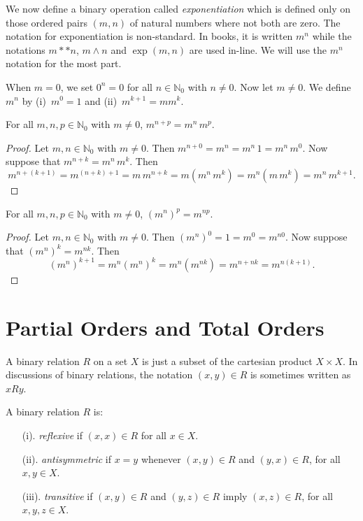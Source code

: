 We now define a binary operation called \textit{exponentiation}
which is defined only on those ordered pairs $(m,n)$ of natural
numbers where not both are zero.  The notation for exponentiation
is non-standard.  In books, it is written $m^n$ while the notations
$m**n$, $m\wedge n$ and $\exp(m,n)$ are used in-line.  We will use
the $m^n$ notation for the most part.

When $m=0$, we set $0^n=0$ for all $n\in\mathbb{N}_0$
with $n\neq0$.  Now let $m\neq0$.  We define $m^n$ by
(i)~$m^0=1$ and (ii)~$m^{k+1}=mm^k$.

\begin{theorem}
For all $m,n,p\in\mathbb{N}_0$ with $m\neq0$,
$m^{n+p}=m^n\,m^p$.
\end{theorem}

\begin{proof}
Let $m,n\in\mathbb{N}_0$ with $m\neq0$.  Then
$m^{n+0}=m^n=m^n\,1=m^n\,m^0$.
Now suppose that $m^{n+k}=m^n\,m^k$.
Then
\[
m^{n+(k+1)}=m^{(n+k)+1}=m\,m^{n+k}
 = m(m^n\,m^k)=m^n(m\,m^k)=m^n\,m^{k+1}.
\]
\end{proof}

\begin{theorem}
For all $m,n,p\in\mathbb{N}_0$ with $m\neq0$,
$(m^n)^p=m^{np}$.
\end{theorem}
\begin{proof}
Let $m,n\in\mathbb{N}_0$ with $m\neq0$.  Then
$(m^n)^0=1=m^0=m^{n0}$.  Now suppose that $(m^n)^k=m^{nk}$.
Then 
\[
(m^n)^{k+1}=m^n(m^n)^k=m^n(m^{nk})=m^{n+nk}=m^{n(k+1)}.
\]
\end{proof}

\section{Partial Orders and Total Orders}\label{s:background:order}

A binary relation $R$ on a set $X$ is just a subset of
the cartesian product $X\times X$.  In discussions of
binary relations, the notation $(x,y)\in R$ is sometimes
written as $xRy$.

A binary relation $R$ is:

\begin{enumerate} 
\item[(i).] \textit{reflexive} if $(x,x)\in R$ for
all $x\in X$.
\item[(ii).] \textit{antisymmetric} if $x=y$ whenever $(x,y)\in R$ and $(y,x)\in R$, for all $x,y\in X$.
\item[(iii).] \textit{transitive} if $(x,y)\in R$ and $(y,z)\in R$
imply $(x,z)\in R$, for all $x,y,z\in X$.
\end{enumerate}

